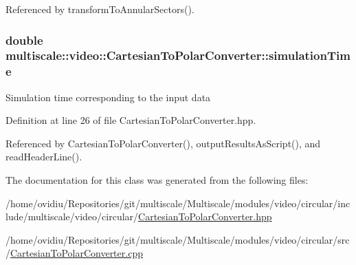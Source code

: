 Referenced by transform\-To\-Annular\-Sectors().

\hypertarget{classmultiscale_1_1video_1_1CartesianToPolarConverter_a78003dc9053d89f56c03408f7f8fedda}{
\subsubsection[{simulation\-Time}]{\setlength{\rightskip}{0pt plus 5cm}double multiscale\-::video\-::\-Cartesian\-To\-Polar\-Converter\-::simulation\-Time\hspace{0.3cm}{\ttfamily [private]}}}\label{classmultiscale_1_1video_1_1CartesianToPolarConverter_a78003dc9053d89f56c03408f7f8fedda}
Simulation time corresponding to the input data 

Definition at line 26 of file Cartesian\-To\-Polar\-Converter.\-hpp.



Referenced by Cartesian\-To\-Polar\-Converter(), output\-Results\-As\-Script(), and read\-Header\-Line().



The documentation for this class was generated from the following files\-:\begin{DoxyCompactItemize}
\item 
/home/ovidiu/\-Repositories/git/multiscale/\-Multiscale/modules/video/circular/include/multiscale/video/circular/\hyperlink{CartesianToPolarConverter_8hpp}{Cartesian\-To\-Polar\-Converter.\-hpp}\item 
/home/ovidiu/\-Repositories/git/multiscale/\-Multiscale/modules/video/circular/src/\hyperlink{CartesianToPolarConverter_8cpp}{Cartesian\-To\-Polar\-Converter.\-cpp}\end{DoxyCompactItemize}
